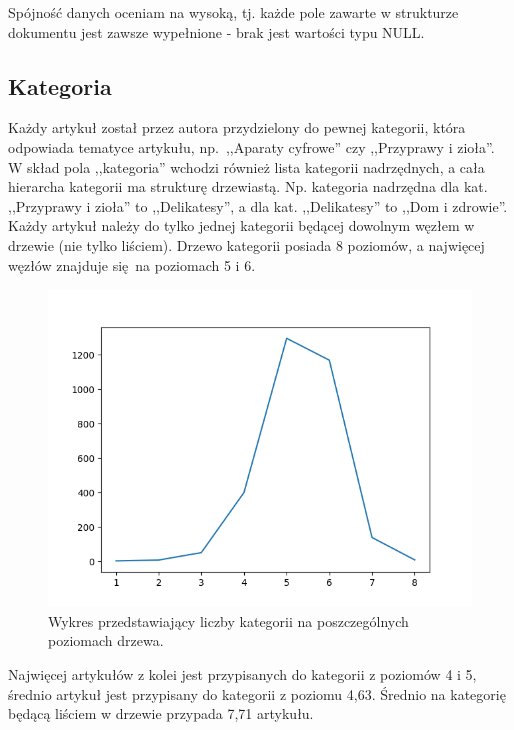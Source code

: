 \documentclass[pl]{minipw} %
\begin{document}
Spójność danych oceniam na wysoką, tj. każde pole zawarte w strukturze dokumentu jest zawsze wypełnione - brak jest wartości typu NULL.

\subsection{Kategoria}

Każdy artykuł został przez autora przydzielony do pewnej kategorii, która odpowiada tematyce artykułu, np.~,,Aparaty cyfrowe'' czy ,,Przyprawy i zioła''. W skład pola ,,kategoria'' wchodzi również lista kategorii nadrzędnych, a cała hierarcha kategorii ma strukturę drzewiastą. Np. kategoria nadrzędna dla kat. ,,Przyprawy i zioła'' to ,,Delikatesy'', a dla kat. ,,Delikatesy'' to  ,,Dom i zdrowie''. Każdy artykuł należy do tylko jednej kategorii będącej dowolnym węzłem w drzewie (nie tylko liściem). Drzewo kategorii posiada 8 poziomów, a najwięcej węzłów znajduje się na poziomach 5 i 6. 
\begin{figure}[H]
	\centering
	\includegraphics[width=1\textwidth]{img/categories_levels.png}
	\caption{Wykres przedstawiający liczby kategorii na poszczególnych poziomach drzewa.}
\end{figure}
Najwięcej artykułów z kolei jest przypisanych do kategorii z poziomów 4 i 5, średnio artykuł jest przypisany do kategorii z poziomu 4,63. Średnio na kategorię będącą liściem w drzewie przypada 7,71 artykułu.
\end{document}
